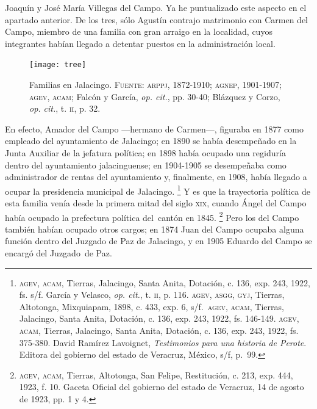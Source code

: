 \documentclass[14pt,twoside,final]{extbook} %
\let\oldfootnote\footnote
\renewcommand\footnote[1]{%
\oldfootnote{\hspace{1mm}#1}}
\begin{document}
Joaquín y José María Villegas del Campo. Ya he puntualizado este aspecto en el apartado anterior. De los tres, sólo Agustín contrajo matrimonio con Carmen del Campo, miembro de una familia con gran arraigo en la localidad, cuyos integrantes habían llegado a detentar puestos en la administración local.
\begin{figure}
\centering
\texttt{[image: tree]}
\caption[Familias en Jalacingo]{Familias en Jalacingo. \textsc{Fuente:} \textsc{arppj, 1872-1910}; \textsc{agnep}, 1901-1907; \textsc{agev, acam}; Falcón y García, \emph{op. cit.}, pp. 30-40; Blázquez y Corzo, \emph{op. cit.}, t. \textsc{ii}, p. 32.}
\label{fig:arbol-genealogico}
\end{figure}
En efecto, Amador del Campo ---hermano de Carmen---, figuraba en 1877 como empleado del ayuntamiento de Jalacingo; en 1890 se había desempeñado en la Junta Auxiliar de la jefatura política; en 1898 había ocupado una regiduría dentro del ayuntamiento jalacinguense; en 1904-1905 se desempeñaba como administrador de rentas del ayuntamiento y, finalmente, en 1908, había llegado a ocupar la presidencia municipal de Jalacingo.\footnote{\textsc{agev, acam}, Tierras, Jalacingo, Santa Anita, Dotación, c. 136, exp. 243, 1922, fs. s/f. García y Velasco, \emph{op. cit.}, t. \textsc{ii}, p. 116. \textsc{agev, asgg, gyj}, Tierras, Altotonga, Mixquiapam, 1898, c. 433, exp. 6, s/f.\ \textsc{agev, acam}, Tierras, Jalacingo, Santa Anita, Dotación, c. 136, exp. 243, 1922, fs. 146-149. \textsc{agev, acam}, Tierras, Jalacingo, Santa Anita, Dotación, c. 136, exp. 243, 1922, fs. 375-380. David Ramírez Lavoignet, \emph{Testimonios para una historia de Perote}. Editora del gobierno del estado de Veracruz, México, s/f, p.\ 99.} Y es que la trayectoria política de esta familia venía desde la primera mitad del siglo \textsc{xix}, cuando Ángel del Campo había ocupado la prefectura política del~cantón en 1845.\footnote{\textsc{agev, acam}, Tierras, Altotonga, San Felipe, Restitución, c. 213, exp. 444, 1923, f. 10. Gaceta Oficial del gobierno del estado de Veracruz, 14 de agosto de 1923, pp. 1 y 4.} Pero los del Campo también habían ocupado otros cargos; en 1874 Juan del Campo ocupaba alguna función dentro del Juzgado de Paz de Jalacingo, y en 1905 Eduardo del Campo se encargó del Juzgado~de Paz.
\end{document}
